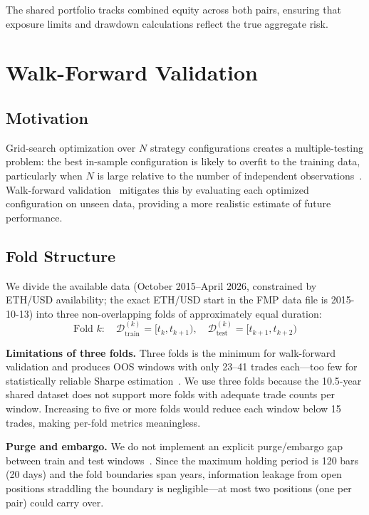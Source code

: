 \documentclass{article}
\begin{document}
The shared portfolio tracks combined equity across both pairs, ensuring that exposure limits and drawdown calculations reflect the true aggregate risk.

\section{Walk-Forward Validation}
\label{sec:walkforward}

\subsection{Motivation}

Grid-search optimization over $N$ strategy configurations creates a multiple-testing problem: the best in-sample configuration is likely to overfit to the training data, particularly when $N$ is large relative to the number of independent observations~\citep{Bailey2017PBO, Harvey2016CrossSection}.
Walk-forward validation~\citep{Pardo2008WFO} mitigates this by evaluating each optimized configuration on unseen data, providing a more realistic estimate of future performance.

\subsection{Fold Structure}

We divide the available data (October 2015--April 2026, constrained by ETH/USD availability; the exact ETH/USD start in the FMP data file is 2015-10-13) into three non-overlapping folds of approximately equal duration:
\begin{equation}
  \text{Fold } k: \quad \mathcal{D}_{\text{train}}^{(k)} = [t_{k}, t_{k+1}), \quad
  \mathcal{D}_{\text{test}}^{(k)} = [t_{k+1}, t_{k+2})
  \label{eq:folds}
\end{equation}

\textbf{Limitations of three folds.}
Three folds is the minimum for walk-forward validation and produces OOS windows with only 23--41 trades each---too few for statistically reliable Sharpe estimation~\citep{lo2002statistics}.
We use three folds because the 10.5-year shared dataset does not support more folds with adequate trade counts per window.
Increasing to five or more folds would reduce each window below 15 trades, making per-fold metrics meaningless.

\textbf{Purge and embargo.}
We do not implement an explicit purge/embargo gap between train and test windows~\citep{LopezDePrado2018}.
Since the maximum holding period is 120 bars (20 days) and the fold boundaries span years, information leakage from open positions straddling the boundary is negligible---at most two positions (one per pair) could carry over.
\end{document}
